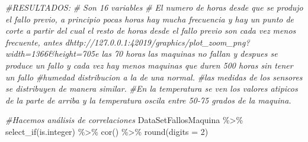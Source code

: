 \documentclass[
]{article}
\newenvironment{Shaded}{\begin{snugshade}}{\end{snugshade}}
\newcommand{\AttributeTok}[1]{\textcolor[rgb]{0.77,0.63,0.00}{#1}}
\newcommand{\CommentTok}[1]{\textcolor[rgb]{0.56,0.35,0.01}{\textit{#1}}}
\newcommand{\DecValTok}[1]{\textcolor[rgb]{0.00,0.00,0.81}{#1}}
\newcommand{\FunctionTok}[1]{\textcolor[rgb]{0.00,0.00,0.00}{#1}}
\newcommand{\NormalTok}[1]{#1}
\newcommand{\SpecialCharTok}[1]{\textcolor[rgb]{0.00,0.00,0.00}{#1}}
\begin{document}
\begin{Shaded}
\begin{Highlighting}[]
\CommentTok{\#RESULTADOS:}
\CommentTok{\# Son 16 variables}
\CommentTok{\# El numero de horas desde que se produjo el fallo previo, a principio pocas horas hay mucha frecuencia y hay un punto de corte a partir del cual el resto de horas desde el fallo previo son cada vez menos frecuente, antes dhttp://127.0.0.1:42019/graphics/plot\_zoom\_png?width=1366\&height=705e las 70 horas las maquinas no fallan y despues se produce un fallo y cada vez hay menos maquinas que duren 500 horas sin tener un fallo}
\CommentTok{\#humedad distribucion a la de una normal.}
\CommentTok{\#las medidas de los sensores se distribuyen de manera similar.}
\CommentTok{\#En la temperatura se ven los valores atipicos de la parte de arriba y la temperatura oscila entre 50{-}75 grados de la maquina.}

\CommentTok{\#Hacemos análisis de correlaciones}
\NormalTok{DataSetFallosMaquina }\SpecialCharTok{\%\textgreater{}\%}
  \FunctionTok{select\_if}\NormalTok{(is.integer) }\SpecialCharTok{\%\textgreater{}\%}
  \FunctionTok{cor}\NormalTok{() }\SpecialCharTok{\%\textgreater{}\%} 
  \FunctionTok{round}\NormalTok{(}\AttributeTok{digits =} \DecValTok{2}\NormalTok{)}
\end{Highlighting}
\end{Shaded}
\end{document}
